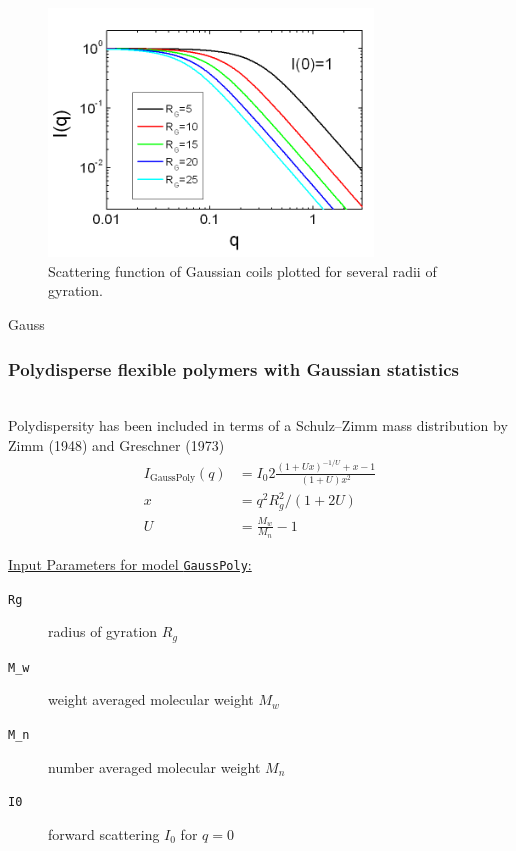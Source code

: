 \begin{figure}[htb]
\begin{center}
\includegraphics[width=0.768\textwidth]{gaussian_coils.png}
\end{center}
\caption{Scattering function of Gaussian coils plotted for several radii of gyration.}
\label{fig:I_gaussian_coils}
\end{figure}

\textcolor[rgb]{1.00,1.00,1.00}{Gauss}\\
\subsubsection{Polydisperse flexible polymers with Gaussian statistics} \cite{Pedersen2002}  \label{sect:GaussPoly}
~\\
Polydispersity has been included in terms of a Schulz–Zimm mass distribution by
Zimm (1948) \cite{zimm:1093}  and Greschner (1973) \cite{Greschner1973}
~\\

\begin{align}
I_\text{GaussPoly}(q) &= I_0 2 \frac{\left( 1+U x\right)^{-1/U}+x-1}{(1+U)x^2} \\
x &= q^2R_g^2/(1+2U) \nonumber \\
U &= \frac{M_w}{M_n} -1 \nonumber
\end{align}

\vspace{5mm}
\uline{Input Parameters for model \texttt{GaussPoly}:}
\begin{description}
\item[\texttt{Rg}] radius of gyration $R_g$
\item[\texttt{M\_w}] weight averaged molecular weight $M_w$
\item[\texttt{M\_n}] number averaged molecular weight $M_n$
\item[\texttt{I0}] forward scattering $I_0$ for $q=0$
\end{description}

